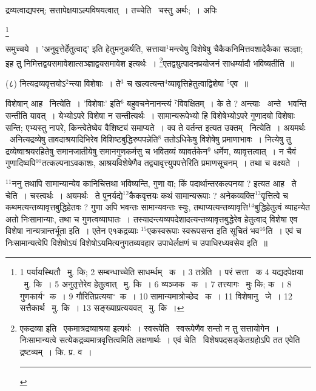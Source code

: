 \documentclass[11pt, openany]{book}
\newcommand\blfootnote[1]{%
 \begingroup
 \renewcommand\thefootnote{}\footnote{#1}%
 \addtocounter{footnote}{-1}%
 \endgroup
}
\begin{document}
द्रव्यत्वाद्यपरम्; सत्तापेक्षयाऽल्पविषयत्वात्~। {\knu तच्चे}ति \textendash\ चस्तु अर्थः;~। अपिः

\blfootnote{1 पर्यायस्थितौ  \textendash\ मु. कि; 2 सम्बन्धाच्चेति साधर्म्धम्  \textendash\ क~। 3 तत्रेति~। परं सत्ता  \textendash\ क 4 यद्यदपेक्षया  \textendash\ मु. कि~। 5 अनुतृत्तेरेव हेतुत्वात्  \textendash\ मु. कि~। 6 व्यञ्जक  \textendash\ क~। 7 तत्त्यागः  \textendash\ मुः कि; क~। 8 गुणकार्य$^\circ$\textendash\ क~। 9 गौरितिप्रत्यया$^\circ$\textendash\ क~। 10 सामान्यमात्रोच्छेद \textendash\ क~। 11 विशेषानु  \textendash\ जे~। 12 सत्तैकार्थ  \textendash\ मु. कि~। 13 सङ्ख्याप्रत्ययवत्  \textendash\ मु. कि~।}

\newpage
\noindent
समुच्चये~। 'अनुवृत्तेर्हेतुत्वाद्' इति हेतुमनुकर्षति, सत्ताया$^1$मन्त्येषु विशेषेषु चैकैकनिमित्तवशादेकैका सञ्ज्ञा; इह तु निमित्तद्वयसमावेशात्सञ्ज्ञाद्वयसमावेश इत्यर्थः~। \renewcommand{\thefootnote}{१}\footnote{एकद्रव्या इति \textendash\ एकमात्रद्रव्याश्रया इत्यर्थः~। स्वरूपेति \textendash\ स्वरूपेणैव सन्तो न तु सत्तायोगेन~। निःसामान्यत्वे सत्येकद्रव्यमात्रवृत्तित्वमिति लक्षणार्थः~। एवं चेति \textendash\ विशेषपदसङ्केतग्रहोऽपि तत एवेति द्रष्टव्यम्~। कि. प्र. व~। \rule{0.4\linewidth}{0.5pt}}एतद्व्युत्पादनप्रयोजनं साधर्म्यादौ भविष्यतीति~॥

\begin{sloppypar}
\hangindent=2cm {\knu (८) नित्यद्रव्यवृत्तयोऽ$^2$न्त्या विशेषाः~। ते$^3$ च खल्वत्यन्त$^4$व्यावृत्तिहेतुत्वाद्विशेषा ${}^5$एव~॥}
\end{sloppypar}

विशेषान् आह \textendash\ नित्येति~। {\knu 'विशेषाः'} इति$^6$ बहुवचनेनानन्त्यं ${}^7$विवक्षितम्~। के ते ? {\knu अन्त्याः } \textendash\ अन्ते \textendash\ भवन्ति सन्तीति यावत्~। येभ्योऽपरे विशेषा न सन्तीत्यर्थः~। सामान्यरूपेभ्यो हि विशेषेभ्योऽपरे गुणादयो विशेषाः सन्ति; एभ्यस्तु नापरे, किन्त्वेतेष्वेव वैशिष्ट्यं समाप्यते~। क्व ते वर्तन्त इत्यत उक्तम् \textendash\ {\knu नित्येति}~। अयमर्थः \textendash\ अनित्यद्रव्येषु तावदाश्रयादिभिरेव विशिष्टबुद्धिरुपपन्नेति$^8$ ततोऽधिकेषु विशेषेषु प्रमाणाभावः~। नित्येषु तु द्रव्येष्वाश्रयरहितेषु समानजातीयेषु समानगुणकर्मसु च भवितव्यं व्यावर्तकेन$^9$ धर्मेण, व्यावृत्तत्वात्~। न चैवं गुणादिष्वपि${}^10$तत्कल्पनाऽवकाशः, आश्रयविशेषेणैव तद्व्यावृत्त्युपपत्तेरिति प्रमाणसूचनम्~। तथा च वक्ष्यते~।

${}^11$ननु तथापि सामान्यान्येव कानिचित्तथा भविष्यन्ति, गुणा वा; किं पदार्थान्तरकल्पनया ? इत्यत आह \textendash\ {\knu ते चेति}~। चस्त्वर्थः~। अयमर्थः \textendash\ ते पुनर्यद्ये$^12$कैकवृत्तयः कथं सामान्यरूपाः ? अनेकव्यक्ति$^13$वृत्तित्वे च कथमत्यन्तव्यावृत्तबुद्धिहेतवः ? गुणा अपि भवन्तः सामान्यवन्तः स्युः, तथाप्यत्यन्तव्यावृत्ति$^14$बुद्धिहेतुत्वं व्याहन्येत अतो निःसामान्याः, तथा च गुणत्वव्याघातः~। तस्यादन्त्यव्यपदेशादत्यन्तव्यावृत्तबुद्धेरेव हेतुत्वाद् विशेषा एव विशेषा नान्यत्रान्तर्भूता इति~। एतेन ए१कद्रव्याः ${}^15$एकस्वरूपाः स्वरूपसन्त इति सूचितं भव$^16$ति~। एवं च निःसामान्यत्वेपि विशेषोऽयं विशेषोऽयमित्यनुगतव्यवहार उपाधेर्लक्षणं च उपाधिरध्यवसेय इति~॥
\end{document}
